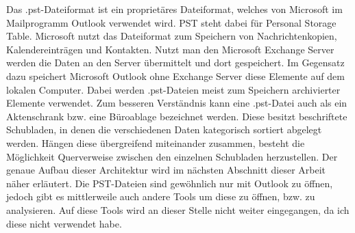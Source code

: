 Das .pst-Dateiformat ist ein proprietäres Dateiformat, welches von Microsoft im Mailprogramm \glqq{}Outlook\grqq{} verwendet wird. PST steht dabei für Personal Storage Table. Microsoft nutzt das Dateiformat zum Speichern von Nachrichtenkopien, Kalendereinträgen und Kontakten. Nutzt man den Microsoft Exchange Server werden die Daten an den Server übermittelt und dort gespeichert. Im Gegensatz dazu speichert Microsoft Outlook ohne Exchange Server diese Elemente auf dem lokalen Computer. Dabei werden .pst-Dateien meist zum Speichern archivierter Elemente verwendet. Zum besseren Verständnis kann eine .pst-Datei auch als ein \glqq{}Aktenschrank\grqq{} bzw. eine \glqq{}Büroablage\grqq{} bezeichnet werden. Diese besitzt beschriftete Schubladen, in denen die verschiedenen Daten kategorisch sortiert abgelegt werden. Hängen diese übergreifend miteinander zusammen, besteht die Möglichkeit Querverweise zwischen den einzelnen Schubladen herzustellen. Der genaue Aufbau dieser Architektur wird im nächsten Abschnitt dieser Arbeit näher erläutert. Die PST-Dateien sind gewöhnlich nur mit Outlook zu öffnen, jedoch gibt es mittlerweile auch andere Tools um diese zu öffnen, bzw. zu analysieren. Auf diese Tools wird an dieser Stelle nicht weiter eingegangen, da ich diese nicht verwendet habe. 

